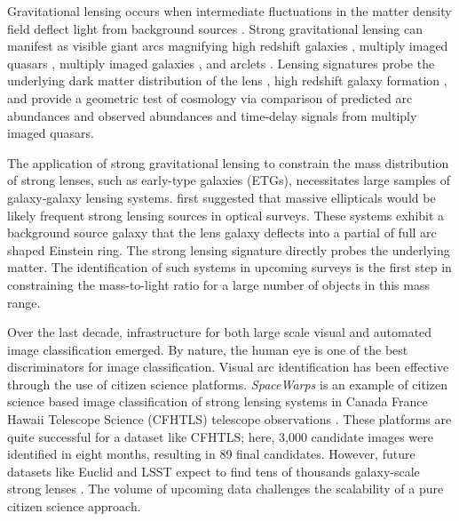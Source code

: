 \documentclass{emulateapj}
\begin{document}
Gravitational lensing occurs when intermediate fluctuations in the
matter density field deflect light from background sources
\citep[see][for a review]{kneibandnatarajan_11}.  Strong gravitational
lensing can manifest as visible giant arcs magnifying high redshift
galaxies \citep{lyndsandpetrosian_86,gladders_etal03}, multiply imaged
quasars \citep{walsh_etal79}, multiply imaged galaxies
\citep{sharon_etal05}, and arclets \citep{bezecourt_etal98}.  Lensing
signatures probe the underlying dark matter distribution of the lens
\citep{warrenanddye_03}, high redshift galaxy formation
\citep{allam_etal07}, and provide a geometric test of cosmology via
comparison of predicted arc abundances and observed abundances
\citep{kochanek_96,chae_03,linder_04} and time-delay signals from
multiply imaged quasars\citep{xli_etal12,suyu_etal14,suyu_etal16}.

The application of strong gravitational lensing to constrain the mass
distribution of strong lenses, such as early-type galaxies (ETGs),
necessitates large samples of galaxy-galaxy lensing systems.
\citet{miraldaescudeandlehar_92} first suggested that massive
ellipticals would be likely frequent strong lensing sources in optical
surveys.  These systems exhibit a background source galaxy that the
lens galaxy deflects into a partial of full arc shaped Einstein ring.
The strong lensing signature directly probes the underlying matter.
The identification of such systems in upcoming surveys is the first
step in constraining the mass-to-light ratio for a large number of
objects in this mass range.

Over the last decade, infrastructure for both large scale visual and
automated image classification emerged. By nature, the human eye is
one of the best discriminators for image classification.  Visual arc
identification has been effective through the use of citizen science
platforms.  {\em SpaceWarps} is an example of citizen science based
image classification of strong lensing systems in Canada France Hawaii
Telescope Science (CFHTLS) telescope observations
\citep{marshall_etal16,more_etal16}.  These platforms are quite
successful for a dataset like CFHTLS; here, 3,000 candidate images
were identified in eight months, resulting in 89 final candidates.
However, future datasets like Euclid \citep{oguriandmarshall_10} and
LSST expect to find tens of thousands galaxy-scale strong lenses
\citep{pawase_etal12}.  The volume of upcoming data challenges the
scalability of a pure citizen science approach.
\end{document}
